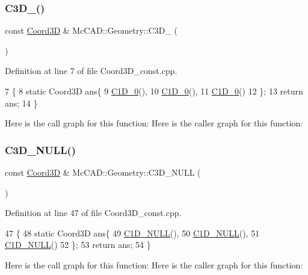 \subsubsection{\texorpdfstring{C3\+D\+\_()}{C3D\_0()}}
{\footnotesize\ttfamily const \hyperlink{classMcCAD_1_1Geometry_1_1Coord3D}{Coord3D} \& Mc\+C\+A\+D\+::\+Geometry\+::\+C3\+D\+\_ (\begin{DoxyParamCaption}{ }\end{DoxyParamCaption})}



Definition at line 7 of file Coord3\+D\+\_\+const.\+cpp.


\begin{DoxyCode}
7                     \{
8     \textcolor{keyword}{static} Coord3D ans\{
9         \hyperlink{namespaceMcCAD_1_1Geometry_aef0aab16ba6382b032e4e3a8a5d37b94}{C1D\_0}(),
10         \hyperlink{namespaceMcCAD_1_1Geometry_aef0aab16ba6382b032e4e3a8a5d37b94}{C1D\_0}(),
11         \hyperlink{namespaceMcCAD_1_1Geometry_aef0aab16ba6382b032e4e3a8a5d37b94}{C1D\_0}()
12     \};
13     \textcolor{keywordflow}{return} ans;
14 \}
\end{DoxyCode}
Here is the call graph for this function\+:
Here is the caller graph for this function\+:
\mbox{\label{namespaceMcCAD_1_1Geometry_ae08bc63c64f6c022b784d73e474724f3}} 
\subsubsection{\texorpdfstring{C3\+D\+\_\+\+N\+U\+L\+L()}{C3D\_NULL()}}
{\footnotesize\ttfamily const \hyperlink{classMcCAD_1_1Geometry_1_1Coord3D}{Coord3D} \& Mc\+C\+A\+D\+::\+Geometry\+::\+C3\+D\+\_\+\+N\+U\+LL (\begin{DoxyParamCaption}{ }\end{DoxyParamCaption})}



Definition at line 47 of file Coord3\+D\+\_\+const.\+cpp.


\begin{DoxyCode}
47                        \{
48     \textcolor{keyword}{static} Coord3D ans\{
49         \hyperlink{namespaceMcCAD_1_1Geometry_ab581ddc27c8a6530d9c1657b77ffe0bf}{C1D\_NULL}(),
50         \hyperlink{namespaceMcCAD_1_1Geometry_ab581ddc27c8a6530d9c1657b77ffe0bf}{C1D\_NULL}(),
51         \hyperlink{namespaceMcCAD_1_1Geometry_ab581ddc27c8a6530d9c1657b77ffe0bf}{C1D\_NULL}()
52     \};
53     \textcolor{keywordflow}{return} ans;
54 \}
\end{DoxyCode}
Here is the call graph for this function\+:
Here is the caller graph for this function\+:
\mbox{\label{namespaceMcCAD_1_1Geometry_a5b06377b725bf2704cc1baf85b0cf1d8}} 
